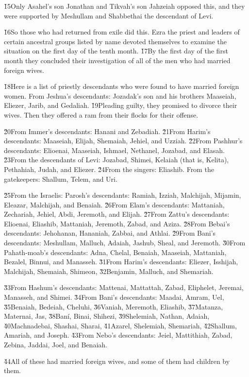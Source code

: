 \v{15}Only Asahel's son Jonathan and Tikvah's son Jahzeiah opposed this, and they were supported by Meshullam and Shabbethai the descendant of Levi.

\v{16}So those who had returned from exile did this. Ezra the priest and leaders of certain ancestral groups listed by name devoted themselves to examine the situation on the first day of the tenth month. \v{17}By the first day of the first month they concluded their investigation of all of the men who had married foreign wives.

\v{18}Here is a list of priestly descendants who were found to have married foreign women. From Jeshua's descendants: Jozadak's son and his brothers Maaseiah, Eliezer, Jarib, and Gedaliah. \v{19}Pleading guilty, they promised to divorce their wives. Then they offered a ram from their flocks for their offense.

\v{20}From Immer's descendants: Hanani and Zebadiah. \v{21}From Harim's descendants: Maaseiah, Elijah, Shemaiah, Jehiel, and Uzziah. \v{22}From Pashhur's descendants: Elioenai, Maaseiah, Ishmael, Nethanel, Jozabad, and Elasah. \v{23}From the descendants of Levi: Jozabad, Shimei, Kelaiah (that is, Kelita), Pethahiah, Judah, and Eliezer. \v{24}From the singers: Eliashib. From the gatekeepers: Shallum, Telem, and Uri.

\v{25}From the Israelis: Parosh's descendants: Ramiah, Izziah, Malchijah, Mijamin, Eleazar, Malchijah, and Benaiah. \v{26}From Elam's descendants: Mattaniah, Zechariah, Jehiel, Abdi, Jeremoth, and Elijah. \v{27}From Zattu's descendants: Elioenai, Eliashib, Mattaniah, Jeremoth, Zabad, and Aziza. \v{28}From Bebai's descendants: Jehohanan, Hananiah, Zabbai, and Athlai. \v{29}From Bani's descendants: Meshullam, Malluch, Adaiah, Jashub, Sheal, and Jeremoth. \v{30}From Pahath-moab's descendants: Adna, Chelal, Benaiah, Maaseiah, Mattaniah, Bezalel, Binnui, and Manasseh. \v{31}From Harim's descendants: Eliezer, Isshijah, Malchijah, Shemaiah, Shimeon, \v{32}Benjamin, Malluch, and Shemariah.

\v{33}From Hashum's descendants: Mattenai, Mattattah, Zabad, Eliphelet, Jeremai, Manasseh, and Shimei. \v{34}From Bani's descendants: Maadai, Amram, Uel, \v{35}Benaiah, Bedeiah, Cheluhi, \v{36}Vaniah, Meremoth, Eliashib, \v{37}Matanza, Maternai, Jas, \v{38}Ban\'{i}, Binai, Shihezi, \v{39}Shelemiah, Nathan, Adaiah, \v{40}Machnadebai, Shashai, Sharai, \v{41}Azarel, Shelemiah, Shemariah, \v{42}Shallum, Amariah, and Joseph. \v{43}From Nebo's descendants: Jeiel, Mattithiah, Zabad, Zebina, Jaddai, Joel, and Benaiah.

\v{44}All of these had married foreign wives, and some of them had children by them.
